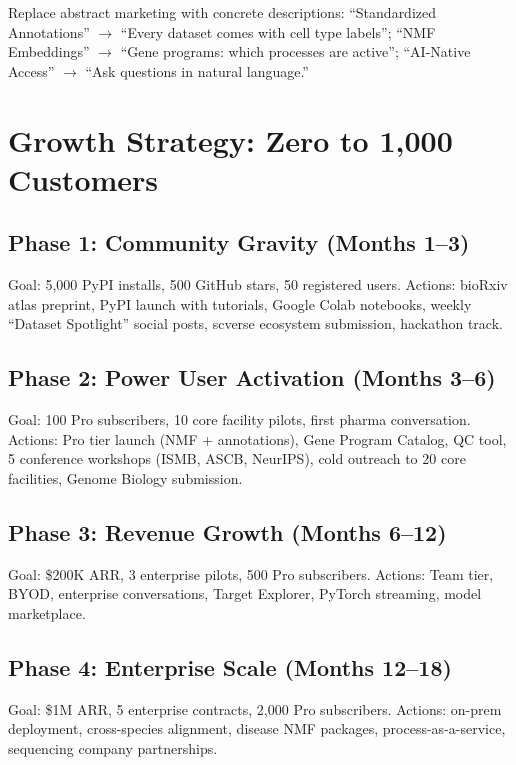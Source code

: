 \documentclass[10pt,twocolumn,letterpaper]{article}
\begin{document}
Replace abstract marketing with concrete descriptions:
``Standardized Annotations'' $\to$ ``Every dataset comes with cell type labels'';
``NMF Embeddings'' $\to$ ``Gene programs: which processes are active'';
``AI-Native Access'' $\to$ ``Ask questions in natural language.''

\section{Growth Strategy: Zero to 1,000 Customers}
\label{sec:growth}

\subsection{Phase 1: Community Gravity (Months 1--3)}

Goal: 5,000 PyPI installs, 500 GitHub stars, 50 registered users.
Actions: bioRxiv atlas preprint, PyPI launch with tutorials, Google Colab
notebooks, weekly ``Dataset Spotlight'' social posts, scverse ecosystem
submission, hackathon track.

\subsection{Phase 2: Power User Activation (Months 3--6)}

Goal: 100 Pro subscribers, 10 core facility pilots, first pharma conversation.
Actions: Pro tier launch (NMF + annotations), Gene Program Catalog, QC tool,
5 conference workshops (ISMB, ASCB, NeurIPS), cold outreach to 20 core
facilities, Genome Biology submission.

\subsection{Phase 3: Revenue Growth (Months 6--12)}

Goal: \$200K ARR, 3 enterprise pilots, 500 Pro subscribers.
Actions: Team tier, BYOD, enterprise conversations, Target Explorer, PyTorch
streaming, model marketplace.

\subsection{Phase 4: Enterprise Scale (Months 12--18)}

Goal: \$1M ARR, 5 enterprise contracts, 2,000 Pro subscribers.
Actions: on-prem deployment, cross-species alignment, disease NMF packages,
process-as-a-service, sequencing company partnerships.
\end{document}

